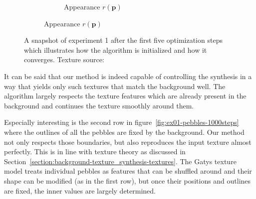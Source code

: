 \begin{figure}[]
\begin{subfigure}{\textwidth}
\begin{subfigure}{0.24\textwidth}
            \caption*{Appearance \(r(\bm{p})\)}
            \vspace*{5mm}
        \end{subfigure}
    \end{subfigure}
    \caption{A snapshot of experiment 1 after the first five optimization steps which illustrates how the algorithm is initialized and how it converges. Texture source: \citet{Gatys2015}}
    \label{fig:ex01-pebbles-5steps}
\end{figure}

It can be said that our method is indeed capable of controlling the synthesis in a way that yields only such textures that match the background well. The algorithm largely respects the texture features which are already present in the background and continues the texture smoothly around them.

Especially interesting is the second row in figure~\ref{fig:ex01-pebbles-1000steps} where the outlines of all the pebbles are fixed by the background. Our method not only respects those boundaries, but also reproduces the input texture almost perfectly. This is in line with texture theory as discussed in Section~\ref{section:background-texture_synthesis-textures}. The Gatys texture model treats individual pebbles as features that can be shuffled around and their shape can be modified (as in the first row), but once their positions and outlines are fixed, the inner values are largely determined.

